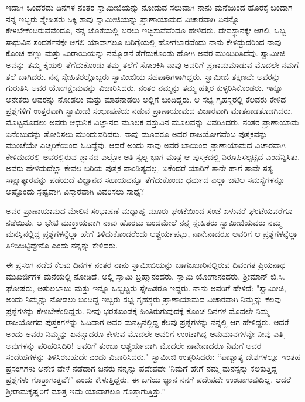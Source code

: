 ಇದಾಗಿ ಒಂದೆರಡು ದಿನಗಳ ನಂತರ ಸ್ವಾಮೀಜಿಯನ್ನು ನೋಡುವ ಸಲುವಾಗಿ ನಾನು ಮನೆಯಿಂದ ಹೊರಕ್ಕೆ ಬಂದಾಗ ನನ್ನ ಇಬ್ಬರು ಸ್ನೇಹಿತರು ಸಿಕ್ಕಿ ತಾವು ಸ್ವಾಮೀಜಿಯನ್ನು ಪ್ರಾಣಾಯಾಮದ ವಿಚಾರವಾಗಿ ಏನನ್ನೊ ಕೇಳಬೇಕೆಂದಿರುವೆವೆಂದೂ, ನನ್ನ ಜೊತೆಯಲ್ಲಿ ಬರಲು ಇಚ್ಛಿಸುವೆವೆಂದೂ ಹೇಳಿದರು. ದೇವಸ್ಥಾನಕ್ಕೇ ಆಗಲಿ, ಒಬ್ಬ ಸಾಧುವಿನ ಸಂದರ್ಶನಕ್ಕೇ ಆಗಲಿ ಯಾವಾಗಲೂ ಬರಿಗೈಯಲ್ಲಿ ಹೋಗಬಾರದೆಂದು ನಾನು ಕೇಳಿದ್ದುದರಿಂದ ನಾವು ಕೊಂಚ ಹಣ್ಣು ಮತ್ತು ಮಿಠಾಯಿಯನ್ನು ನಮ್ಮೊಡನೆ ತೆಗೆದುಕೊಂಡು ಹೋಗಿ ಅವರ ಮುಂದಿರಿಸಿದೆವು. ಸ್ವಾಮೀಜಿ ಅವನ್ನು ತಮ್ಮ ಕೈಯಲ್ಲಿ ತೆಗೆದುಕೊಂಡು ತಮ್ಮ ತಲೆಗೆ ಸೋಂಕಿಸಿ ನಾವು ಅವರಿಗೆ ಪ್ರಣಾಮಮಾಡುವ ಮೊದಲೇ ನಮಗೆ ತಲೆ ಬಾಗಿದರು. ನನ್ನ ಸ್ನೇಹಿತರಲ್ಲೊಬ್ಬರು ಸ್ವಾಮೀಜಿಯ ಸಹಪಾಠಿಗಳಾಗಿದ್ದರು. ಸ್ವಾಮೀಜಿ ತಕ್ಷಣವೇ ಅವರನ್ನು ಗುರುತಿಸಿ ಅವರ ಯೋಗಕ್ಷೇಮವನ್ನು ವಿಚಾರಿಸಿದರು. ನಂತರ ನಮ್ಮನ್ನು ತಮ್ಮ ಹತ್ತಿರ ಕುಳ್ಳಿರಿಸಿಕೊಂಡರು. ಇನ್ನೂ ಅನೇಕರು ಅವರನ್ನು ನೋಡಲು ಮತ್ತು ಮಾತನಾಡಲು ಅಲ್ಲಿಗೆ ಬಂದಿದ್ದರು. ಆ ಸಭ್ಯ ಗೃಹಸ್ಥರಲ್ಲಿ ಕೆಲವರು ಕೇಳಿದ ಪ್ರಶ್ನೆಗಳಿಗೆ ಉತ್ತರವಾಗಿ ಸ್ವಾಮೀಜಿ ಸಂಭಾಷಣೆಯ ನಡುವೆ ಪ್ರಾಣಾಯಾಮದ ವಿಚಾರವಾಗಿ ಮಾತನಾಡತೊಡಗಿದರು. ಮೊಟ್ಟಮೊದಲು ಅವರು ಆಧುನಿಕ ವಿಜ್ಞಾನದ ಮೂಲಕ ವಸ್ತುವಿನ ಮೂಲವನ್ನು ವಿವರಿಸಿದರು. ನಂತರ ಪ್ರಾಣಾಯಾಮ ಏನೆಂಬುದನ್ನು ತೋರಿಸಲು ಮುಂದುವರಿದರು. ನಾವು ಮೂವರೂ ಅವರ ರಾಜಯೋಗವೆಂಬ ಪುಸ್ತಕವನ್ನು ಮುಂಚೆಯೇ ಎಚ್ಚರಿಕೆಯಿಂದ ಓದಿದ್ದೆವು. ಆದರೆ ಅಂದು ನಾವು ಅವರ ಬಾಯಿಂದ ಪ್ರಾಣಾಯಾಮದ ವಿಚಾರವಾಗಿ ಕೇಳಿದುದರಲ್ಲಿ ಅವರಲ್ಲಿರುವ ಜ್ಞಾನದ ಎಲ್ಲೋ ಅತಿ ಸ್ವಲ್ಪ ಭಾಗ ಮಾತ್ರ ಆ ಪುಸ್ತಕದಲ್ಲಿ ನಿರೂಪಿಸಲ್ಪಟ್ಟಿದೆ ಎಂದೆನ್ನಿಸಿತು. ಅವರು ಹೇಳಿದುದೆಲ್ಲಾ ಕೇವಲ ಬರಿಯ ಪುಸ್ತಕ ಪಾಂಡಿತ್ಯವಲ್ಲ. ಏಕೆಂದರೆ ಯಾರಿಗೆ ತಾನೇ ಹಾಗೆ ತಾವೇ ಸತ್ಯ ಸಾಕ್ಷಾತ್ಕಾರವನ್ನು ಪಡೆಯದೆ ವಿಜ್ಞಾನದ ಸಹಾಯವನ್ನೂ ತೆಗೆದುಕೊಂಡು ಧರ್ಮದ ಎಲ್ಲಾ ಜಟಿಲ ಸಮಸ್ಯೆಗಳನ್ನೂ ಅಷ್ಟೊಂದು ಸ್ಪಷ್ಟವಾಗಿ ವಿಸ್ತಾರವಾಗಿ ವಿವರಿಸಲು ಸಾಧ್ಯ?

ಅವರ ಪ್ರಾಣಾಯಾಮದ ಮೇಲಿನ ಸಂಭಾಷಣೆ ಮಧ್ಯಾಹ್ನ ಮೂರು ಘಂಟೆಯಿಂದ ಸಂಜೆ ಏಳುವರೆ ಘಂಟೆಯವರೆಗೂ ನಡೆಯಿತು. ಆ ಭೇಟಿ ಮುಕ್ತಾಯವಾಗಿ ನಾವು ಹೊರಟು ಬಂದಮೇಲೆ ನನ್ನ ಸ್ನೇಹಿತರು ಸ್ವಾಮೀಜಿಯವರು ನಮ್ಮ ಮನಸ್ಸಿನಲ್ಲಿದ್ದ ಪ್ರಶ್ನೆಗಳನ್ನೆಲ್ಲಾ ಹೇಗೆ ತಿಳಿದುಕೊಂಡರೆಂದು ಆಶ್ಚರ್ಯಪಟ್ಟು, ನಾನೇನಾದರೂ ಅವರಿಗೆ ಆ ಪ್ರಶ್ನೆಗಳನ್ನೆಲ್ಲಾ ತಿಳಿಸಿಬಿಟ್ಟಿದ್ದೇನೊ ಎಂದು ನನ್ನನ್ನು ಕೇಳಿದರು.

ಈ ಪ್ರಸಂಗ ನಡೆದ ಕೆಲವು ದಿನಗಳ ನಂತರ ನಾನು ಸ್ವಾಮೀಜಿಯನ್ನು ಬಾಗಬಜಾರಿನಲ್ಲಿರುವ ದಿವಂಗತ ಪ್ರಿಯನಾಥ ಮುಖರ್ಜಿಗಳ ಮನೆಯಲ್ಲಿ ನೋಡಿದೆ. ಅಲ್ಲಿ ಸ್ವಾಮಿ ಬ್ರಹ್ಮಾನಂದರು, ಸ್ವಾಮಿ ಯೋಗಾನಂದರು, ಶ‍್ರೀಮಾನ್ ಜಿ.ಸಿ. ಘೋಷರು, ಅತುಲಬಾಬು ಮತ್ತು ಇನ್ನೂ ಒಬ್ಬಿಬ್ಬರು ಸ್ನೇಹಿತರೂ ಇದ್ದರು. ನಾನು ಅವರಿಗೆ ಹೇಳಿದೆ: "ಸ್ವಾಮೀಜಿ, ಅಂದು ನಿಮ್ಮನ್ನು ನೋಡಲು ಬಂದಿದ್ದ ಇಬ್ಬರು ಸಭ್ಯ ಗೃಹಸ್ಥರು ಪ್ರಾಣಾಯಾಮದ ವಿಚಾರವಾಗಿ ನಿಮ್ಮನ್ನು ಕೆಲವು ಪ್ರಶ್ನೆಗಳನ್ನು ಕೇಳಬೇಕೆಂದಿದ್ದರು. ನೀವು ಭರತಖಂಡಕ್ಕೆ ಹಿಂತಿರುಗುವುದಕ್ಕೆ ಕೊಂಚ ದಿನಗಳ ಮೊದಲೇ ನಿಮ್ಮ ರಾಜಯೋಗದ ಪುಸ್ತಕಗಳನ್ನು ಓದಿದಾಗ ಅವರ ಮನಸ್ಸಿನಲ್ಲಿದ್ದ ಕೆಲವು ಪ್ರಶ್ನೆಗಳನ್ನು ನನ್ನಲ್ಲಿ ಆಗ ಹೇಳಿದ್ದರು. ಆದರೆ ಅಂದು ಅವರು ನಿಮ್ಮನ್ನು ಏನನ್ನಾದರೂ ಕೇಳುವ ಮೊದಲೇ ಅವರಿಗೆ ಉಂಟಾಗಿದ್ದ ಅನುಮಾನಗಳನ್ನೇ ನೀವು ಎತ್ತಿ ಅವುಗಳನ್ನು ಪರಿಹರಿಸಿದಿರಿ! ಅವರಿಗೆ ತುಂಬಾ ಆಶ್ಚರ್ಯವಾಗಿ ಮೊದಲೇ ನಾನೇನಾದರೂ ನಿಮಗೆ ಅವರ ಸಂದೇಹಗಳನ್ನು ತಿಳಿಸಿರಬಹುದೇ ಎಂದು ವಿಚಾರಿಸಿದರು." ಸ್ವಾಮೀಜಿ ಉತ್ತರಿಸಿದರು: “ಪಾಶ್ಚಾತ್ಯ ದೇಶಗಳಲ್ಲೂ ಇಂತಹ ಪ್ರಸಂಗಗಳು ಅನೇಕ ವೇಳೆ ನಡೆದಾಗ ಜನರು ನನ್ನನ್ನು ಪದೇಪದೇ 'ನಿಮಗೆ ಹೇಗೆ ನಮ್ಮ ಮನಸ್ಸನ್ನು ಕಲಕುತ್ತಿದ್ದ ಪ್ರಶ್ನೆಗಳು ಗೊತ್ತಾಗುತ್ತವೆ?' ಎಂದು ಕೇಳುತ್ತಿದ್ದರು. ಈ ಬಗೆಯ ಜ್ಞಾನ ನನಗೆ ಪದೇಪದೇ ಉಂಟಾಗುವುದಿಲ್ಲ. ಆದರೆ ಶ‍್ರೀರಾಮಕೃಷ್ಣರಿಗೆ ಮಾತ್ರ ಇದು ಯಾವಾಗಲೂ ಗೊತ್ತಾಗುತ್ತಿತ್ತು.”

